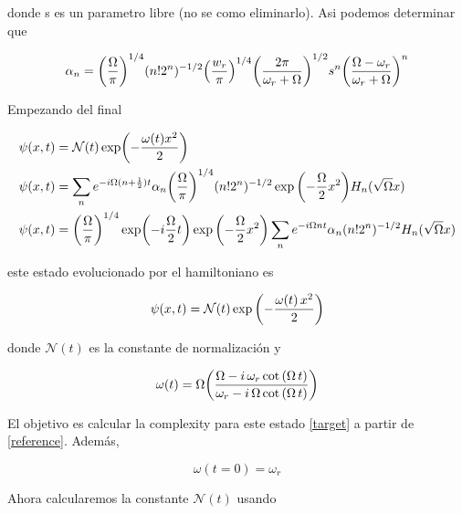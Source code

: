 \documentclass[../Main.tex]{subfiles}
\begin{document}
donde s es un parametro libre (no se  como eliminarlo). Asi podemos determinar que

\begin{equation}
\alpha_n  = \pqty{\frac{\Omega}{\pi}}^{1/4}(n!2^n)^{-1/2}\pqty{\frac{w_r}{\pi}}^{1/4}\pqty{\dfrac{2\pi}{\omega_{r}+\Omega}}^{1/2}s^n\pqty{\dfrac{\Omega-\omega_{r}}{\omega_{r}+\Omega}}^n
\end{equation}





Empezando del final

\begin{equation}
\begin{split}
\psi (x,t) & = \mathcal{N}(t)\exp(-\dfrac{\omega(t)x^2}{2}) \\
\psi (x,t) & =\sum_n e^{-i\Omega(n+\frac{1}{2})t}\alpha_n\pqty{\frac{\Omega}{\pi}}^{1/4}(n!2^n)^{-1/2} \exp \pqty{- \frac{\Omega}{2}x^2} H_n(\sqrt{\Omega} x) \\
\psi (x,t) & =\pqty{\frac{\Omega}{\pi}}^{1/4}\exp(-i\dfrac{\Omega}{2}t)\exp \pqty{- \frac{\Omega}{2}x^2}\sum_n e^{-i\Omega nt}\alpha_n(n!2^n)^{-1/2}  H_n(\sqrt{\Omega} x)
\end{split}
\end{equation} 







este estado evolucionado por el hamiltoniano es

\begin{equation}
\psi (x,t) =\mathcal{N}(t)  \exp \pqty{- \frac{ \omega(t) \, x^2}{2} } 
\label{target}
\end{equation}

donde $\mathcal{N}(t)$ es la constante de normalización y \citep{Shankar_1995}

\begin{equation}  
\omega(t)=\Omega \pqty{\dfrac{\Omega-i\,\omega_r \cot\qty(\Omega\, t)}{\omega_r-i\,\Omega \cot\qty(\Omega\, t)}}
\label{Omega}
\end{equation}

El objetivo es calcular la complexity para este estado \eqref{target} a partir de \eqref{reference}. Además,

\begin{equation}
\omega(t=0)=\omega_r
\end{equation}

Ahora calcularemos la constante $\mathcal{N}(t)$ usando
\end{document}
